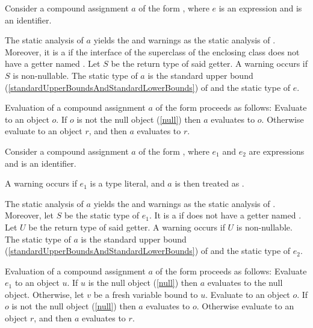 \documentclass[makeidx]{article}
\begin{document}
\LMHash{}%
Consider a compound assignment $a$ of the form ,
where $e$ is an expression and \id{} is an identifier.

\LMHash{}%
The static analysis of $a$ yields
the  and warnings as
the static analysis of .
Moreover, it is a 
if the interface of the superclass of the enclosing class
does not have a getter named \id.
Let $S$ be the return type of said getter.
A warning occurs if $S$ is non-nullable.
The static type of $a$ is the standard upper bound
(\ref{standardUpperBoundsAndStandardLowerBounds})
of  and the static type of $e$.

\LMHash{}%
Evaluation of a compound assignment $a$ of the form 
proceeds as follows:
Evaluate  to an object $o$.
If $o$ is not the null object (\ref{null}) then $a$ evaluates to $o$.
Otherwise evaluate  to an object $r$,
and then $a$ evaluates to $r$.
\EndCase

\LMHash{}%
Consider a compound assignment $a$ of the form ,
where $e_1$ and $e_2$ are expressions and \id{} is an identifier.

\LMHash{}%
A warning occurs if $e_1$ is a type literal,
and $a$ is then treated as .

\LMHash{}%
The static analysis of $a$ yields
the  and warnings as
the static analysis of .
Moreover, let $S$ be the static type of $e_1$.
It is a 
if  does not have a getter named \id.
Let $U$ be the return type of said getter.
A warning occurs if $U$ is non-nullable.
The static type of $a$ is the standard upper bound
(\ref{standardUpperBoundsAndStandardLowerBounds})
of  and the static type of $e_2$.

\LMHash{}%
Evaluation of a compound assignment $a$ of the form
proceeds as follows:
Evaluate $e_1$ to an object $u$.
If $u$ is the null object (\ref{null}) then $a$ evaluates to the null object.
Otherwise, let $v$ be a fresh variable bound to $u$.
Evaluate  to an object $o$.
If $o$ is not the null object (\ref{null}) then $a$ evaluates to $o$.
Otherwise evaluate  to an object $r$,
and then $a$ evaluates to $r$.
\EndCase
\end{document}
